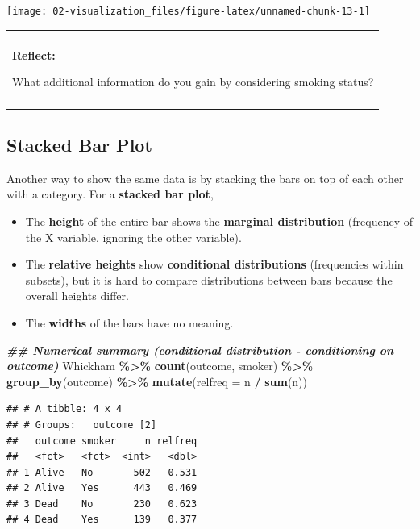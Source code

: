 \documentclass[
]{book}
\newenvironment{Shaded}{\begin{snugshade}}{\end{snugshade}}
\newcommand{\AttributeTok}[1]{\textcolor[rgb]{0.13,0.29,0.53}{#1}}
\newcommand{\DocumentationTok}[1]{\textcolor[rgb]{0.56,0.35,0.01}{\textbf{\textit{#1}}}}
\newcommand{\FunctionTok}[1]{\textcolor[rgb]{0.13,0.29,0.53}{\textbf{#1}}}
\newcommand{\NormalTok}[1]{#1}
\newcommand{\SpecialCharTok}[1]{\textcolor[rgb]{0.81,0.36,0.00}{\textbf{#1}}}
\providecommand{\tightlist}{%
  \setlength{\itemsep}{0pt}\setlength{\parskip}{0pt}}
\newenvironment{reflect}
{
    \begin{center}
    
    \begin{tabular}{|p{0.8\textwidth}|}
    \rowcolor{LightBlue}
    \hline\\
    \rowcolor{LightBlue}
    \textbf{Reflect:}
}
{
    \\\rowcolor{LightBlue}
    \\\hline
    \end{tabular} 
    \end{center}
}
\begin{document}
\begin{center}\texttt{[image: 02-visualization\_files/figure-latex/unnamed-chunk-13-1]} \end{center}

\begin{reflect}
What additional information do you gain by considering smoking status?
\end{reflect}

\subsection{Stacked Bar Plot}\label{stacked-bar-plot}

Another way to show the same data is by stacking the bars on top of each other with a category. For a \textbf{stacked bar plot},

\begin{itemize}
\tightlist
\item
  The \textbf{height} of the entire bar shows the \textbf{marginal distribution} (frequency of the X variable, ignoring the other variable).
\item
  The \textbf{relative heights} show \textbf{conditional distributions} (frequencies within subsets), but it is hard to compare distributions between bars because the overall heights differ.
\item
  The \textbf{widths} of the bars have no meaning.
\end{itemize}

\begin{Shaded}
\begin{Highlighting}[]
\DocumentationTok{\#\# Numerical summary (conditional distribution {-} conditioning on outcome)}
\NormalTok{Whickham }\SpecialCharTok{\%\textgreater{}\%}
    \FunctionTok{count}\NormalTok{(outcome, smoker) }\SpecialCharTok{\%\textgreater{}\%}
    \FunctionTok{group\_by}\NormalTok{(outcome) }\SpecialCharTok{\%\textgreater{}\%}
    \FunctionTok{mutate}\NormalTok{(}\AttributeTok{relfreq =}\NormalTok{ n }\SpecialCharTok{/} \FunctionTok{sum}\NormalTok{(n)) }
\end{Highlighting}
\end{Shaded}

\begin{verbatim}
## # A tibble: 4 x 4
## # Groups:   outcome [2]
##   outcome smoker     n relfreq
##   <fct>   <fct>  <int>   <dbl>
## 1 Alive   No       502   0.531
## 2 Alive   Yes      443   0.469
## 3 Dead    No       230   0.623
## 4 Dead    Yes      139   0.377
\end{verbatim}
\end{document}
